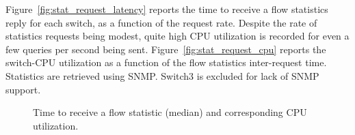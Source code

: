 Figure~\ref{fig:stat_request_latency} reports the time to receive a flow
statistics reply for each switch, as a function of the request rate. Despite the
rate of statistics requests being modest, quite high CPU utilization is recorded
for even a few queries per second being sent. Figure~\ref{fig:stat_request_cpu}
reports the switch-CPU utilization as a function of the flow statistics
inter-request time. Statistics are retrieved using SNMP\@. Switch3 is excluded for
lack of SNMP support.

\begin{figure}[h]
  \begin{center}
  \end{center}
  \caption{Time to receive a flow statistic (median) and corresponding CPU utilization.}
  \label{fig:stat_request}
\end{figure}

